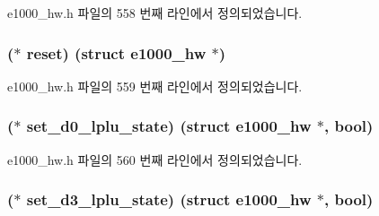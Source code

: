 e1000\+\_\+hw.\+h 파일의 558 번째 라인에서 정의되었습니다.

\subsubsection[{\texorpdfstring{reset}{reset}}]{($\ast$ reset) (struct {\bf e1000\+\_\+hw} $\ast$)}\hypertarget{structe1000__phy__operations_aef9d6fbe479defb756ad67276bedfdc6}{}\label{structe1000__phy__operations_aef9d6fbe479defb756ad67276bedfdc6}


e1000\+\_\+hw.\+h 파일의 559 번째 라인에서 정의되었습니다.

\subsubsection[{\texorpdfstring{set\+\_\+d0\+\_\+lplu\+\_\+state}{set_d0_lplu_state}}]{($\ast$ set\+\_\+d0\+\_\+lplu\+\_\+state) (struct {\bf e1000\+\_\+hw} $\ast$, {\bf bool})}\hypertarget{structe1000__phy__operations_ac776eb575de99b291031dd2d4dff5f4a}{}\label{structe1000__phy__operations_ac776eb575de99b291031dd2d4dff5f4a}


e1000\+\_\+hw.\+h 파일의 560 번째 라인에서 정의되었습니다.

\subsubsection[{\texorpdfstring{set\+\_\+d3\+\_\+lplu\+\_\+state}{set_d3_lplu_state}}]{($\ast$ set\+\_\+d3\+\_\+lplu\+\_\+state) (struct {\bf e1000\+\_\+hw} $\ast$, {\bf bool})}\hypertarget{structe1000__phy__operations_a78ba346712f4dac43d90c15532953540}{}\label{structe1000__phy__operations_a78ba346712f4dac43d90c15532953540}


